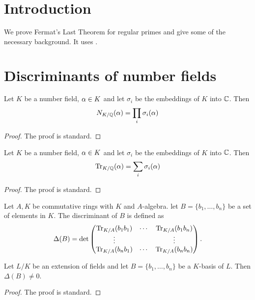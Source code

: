 	\maketitle
\tableofcontents
\section{Introduction}
We prove Fermat's Last Theorem for regular primes and give some of the necessary background. It uses \cite{Samuel,marcus,washington}.

\section{Discriminants of number fields}
\begin{lemma}\label{lemma:alt_definition_of_norm}
    \leanok
	Let $K$ be a number field, $\alpha \in K$ and let $\sigma_i$ be the embeddings of $K$ into $\mathbb{C}$. Then \[N_{K/\mathbb{Q}}(\alpha)=\prod_i \sigma_i(\alpha)  \]
\end{lemma}
\begin{proof}
  \leanok
  The proof is standard.
\end{proof}


\begin{lemma}\label{lemma:alt_definition_of_trace}
    \leanok
	Let $K$ be a number field, $\alpha \in K$ and let $\sigma_i$ be the embeddings of $K$ into $\mathbb{C}$. Then \[\operatorname{Tr}_{K/\mathbb{Q}}(\alpha) =\sum_i \sigma_i(\alpha) \]
\end{lemma}
\begin{proof}
  \leanok
  The proof is standard.
\end{proof}

\begin{definition}\label{defn_of_disc}
	\leanok
	Let $A,K$ be commutative rings with $K$ and $A$-algebra. let $B=\{b_1,\dots,b_n\}$ be a set of elements in $K$. The discriminant of $B$ is defined as \[\Delta(B)=  \det \left (\begin{matrix} \operatorname{Tr}_{K/A}(b_1b_1) &\cdots& \operatorname{Tr}_{K/A}(b_1b_n)\\ \vdots & & \vdots \\  \operatorname{Tr}_{K/A}(b_nb_1) &\cdots& \operatorname{Tr}_{K/A}(b_nb_n)
	\end{matrix} \right ).\]
\end{definition}

\begin{lemma}\label{lem:lin_indep_iff_disc_ne_zero}
    \leanok
	Let $L/K$ be an extension of fields and let $B=\{b_1,\dots,b_n\}$ be a $K$-basis of $L$. Then $\Delta(B) \neq 0$.
\end{lemma}
\begin{proof}
  \leanok
  The proof is standard.
\end{proof}

